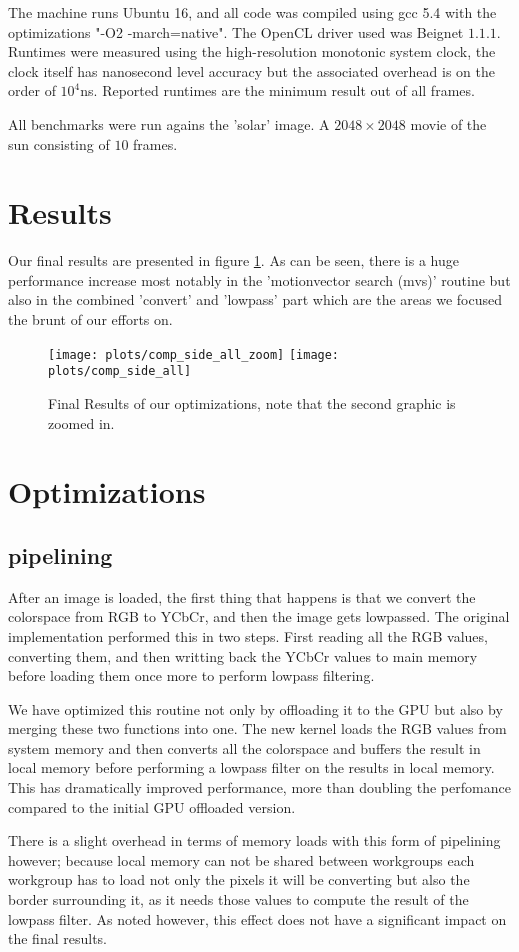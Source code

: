 \par The machine runs Ubuntu 16, and all code was compiled using gcc 5.4 with the optimizations "-O2 -march=native". The OpenCL driver used was Beignet $1.1.1$.
Runtimes were measured using the high-resolution monotonic system clock, the clock itself has nanosecond level accuracy but the associated overhead is on the order of
$10^4$ns. Reported runtimes are the minimum result out of all frames.

\par All benchmarks were run agains the 'solar' image. A $2048\times2048$ movie of the sun consisting of $10$ frames.

\section{Results}
Our final results are presented in figure \ref{fig:res}. As can be seen, there is a huge performance increase most notably in the 'motionvector search (mvs)' routine
but also in the combined 'convert' and 'lowpass' part which are the areas we focused the brunt of our efforts on.
\begin{figure}
  \centering
  \texttt{[image: plots/comp\_side\_all\_zoom]}
  \texttt{[image: plots/comp\_side\_all]}\\
  \caption{Final Results of our optimizations, note that the second graphic is zoomed in.}
  \label{fig:res}
\end{figure}


\section{Optimizations}

\subsection{pipelining}
After an image is loaded, the first thing that happens is that we convert the colorspace from RGB to YCbCr, and then the image gets lowpassed.
The original implementation performed this in two steps. First reading all the RGB values, converting them, and then writting back the YCbCr values
to main memory before loading them once more to perform lowpass filtering.
\par We have optimized this routine not only by offloading it to the GPU but also by merging these two functions into one. The new kernel loads the RGB values from system memory and
then converts all the colorspace and buffers the result in local memory before performing a lowpass filter
on the results in local memory. This has dramatically improved performance, more than doubling the perfomance compared to the initial GPU offloaded version.
\par There is a slight overhead in terms of memory loads with this form of pipelining however; because local memory can not be shared between workgroups each workgroup has to load not
only the pixels it will be converting but also the border surrounding it, as it needs those values to compute the result of the lowpass filter.  As noted however,
this effect does not have a significant impact on the final results.

